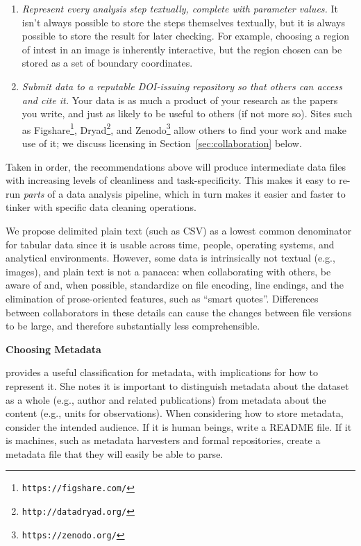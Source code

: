 \documentclass[10pt]{article}
\newcommand{\recommend}[1]{\textit{#1}}
\newcommand{\withurl}[2]{{#1}\footnote{\texttt{#2}}}
\begin{document}
\begin{enumerate}
\item
  \recommend{Represent every analysis step textually, complete with
    parameter values.}  It isn't always possible to store the steps
  themselves textually, but it is always possible to store the result
  for later checking.  For example, choosing a region of intest in an
  image is inherently interactive, but the region chosen can be stored
  as a set of boundary coordinates.

\item
  \recommend{Submit data to a reputable DOI-issuing repository so that
    others can access and cite it.}  Your data is as much a product of
  your research as the papers you write, and just as likely to be
  useful to others (if not more so).  Sites such as
  \withurl{Figshare}{https://figshare.com/},
  \withurl{Dryad}{http://datadryad.org/}, and
  \withurl{Zenodo}{https://zenodo.org/} allow others to find your work
  and make use of it; we discuss licensing in
  Section~\ref{sec:collaboration} below.

\end{enumerate}

Taken in order, the recommendations above will
produce intermediate data files with increasing levels of cleanliness
and task-specificity. This makes it easy to re-run \emph{parts}
of a data analysis pipeline, which in turn makes it easier and faster
to tinker with specific data cleaning operations.

We propose delimited plain text (such as CSV) as a lowest common
denominator for tabular data since it is usable across time, people,
operating systems, and analytical environments. However, some data is
intrinsically not textual (e.g., images), and plain text is not a
panacea: when collaborating with others, be aware of and, when
possible, standardize on file encoding, line endings, and the
elimination of prose-oriented features, such as ``smart
quotes''. Differences between collaborators in these details can cause
the changes between file versions to be large, and therefore
substantially less comprehensible.

\begin{framed}
\noindent \textbf{Choosing Metadata}

\cite{wickes2015} provides a useful classification for metadata, with implications for
how to represent it. She notes it is important to distinguish
metadata about the dataset as a whole (e.g., author and related publications)
from metadata about the content (e.g., units for observations).
When considering how to store metadata, consider the intended
audience. If it is human beings, write a README file. If it is machines, such as
metadata harvesters and formal repositories, create a metadata file
that they will easily be able to parse.
\end{framed}
\end{document}
